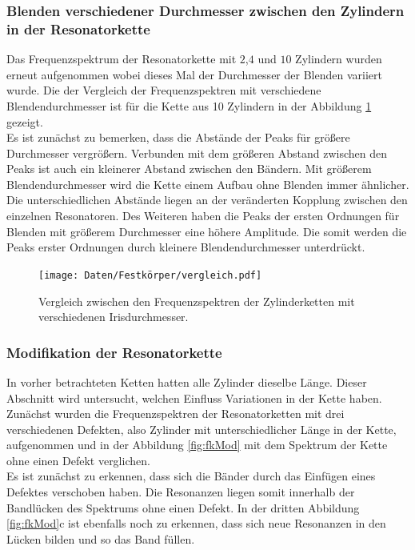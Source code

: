 \subsubsection{Blenden verschiedener Durchmesser zwischen den Zylindern in der Resonatorkette}

Das Frequenzspektrum der Resonatorkette mit $2$,$4$ und $10$ Zylindern wurden erneut aufgenommen wobei dieses Mal der Durchmesser der Blenden variiert wurde. 
Die der Vergleich der Frequenzspektren mit verschiedene Blendendurchmesser ist für die Kette aus 10 Zylindern in der Abbildung \ref{fig:fkvergleich} gezeigt. \\
Es ist zunächst zu bemerken, dass die Abstände der Peaks für größere Durchmesser vergrößern. Verbunden mit dem größeren Abstand zwischen den Peaks ist auch ein kleinerer Abstand zwischen den Bändern. Mit größerem Blendendurchmesser wird die Kette einem Aufbau ohne Blenden immer ähnlicher. 
Die unterschiedlichen Abstände liegen an der veränderten Kopplung zwischen den einzelnen Resonatoren. 
Des Weiteren haben die Peaks der ersten Ordnungen für Blenden mit größerem Durchmesser eine höhere Amplitude. Die somit werden die Peaks erster Ordnungen durch kleinere Blendendurchmesser unterdrückt. 

\begin{figure}[H]
  \centering
  \texttt{[image: Daten/Festkörper/vergleich.pdf]}
  \caption{Vergleich zwischen den Frequenzspektren der Zylinderketten mit verschiedenen Irisdurchmesser.}
  \label{fig:fkvergleich}
\end{figure}
\subsubsection{Modifikation der Resonatorkette}

In vorher betrachteten Ketten hatten alle Zylinder dieselbe Länge. 
Dieser Abschnitt wird untersucht, welchen Einfluss Variationen in der Kette haben. \\
Zunächst wurden die Frequenzspektren der Resonatorketten mit drei verschiedenen Defekten, also Zylinder mit unterschiedlicher Länge in der Kette, aufgenommen und in der Abbildung \ref{fig:fkMod} mit dem Spektrum der Kette ohne einen Defekt verglichen. \\
Es ist zunächst zu erkennen, dass sich die Bänder durch das Einfügen eines Defektes verschoben haben. Die Resonanzen liegen somit innerhalb der Bandlücken des Spektrums ohne einen Defekt. In der dritten Abbildung \ref{fig:fkMod}c ist ebenfalls noch zu erkennen, dass sich neue Resonanzen in den Lücken bilden und so das Band füllen. 


